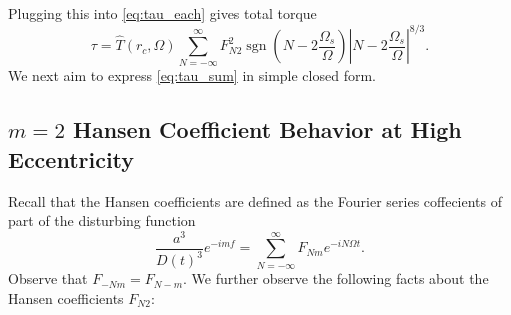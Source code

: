 \documentclass[
        fleqn,
        usenatbib,
        referee,
    ]{mnras}
\newcommand*{\abs}[1]{\left|#1\right|}
\newcommand*{\p}[1]{\left(#1\right)}
\DeclareMathOperator*{\sgn}{sgn}
\begin{document}
Plugging this into \autoref{eq:tau_each} gives total torque
\begin{equation}
    \tau = \hat{T}(r_c, \Omega) \sum\limits_{N = -\infty}^\infty
        F_{N2}^2 \sgn\p{N - 2\frac{\Omega_s}{\Omega}}
            \abs{N - 2\frac{\Omega_s}{\Omega}}^{8/3}.\label{eq:tau_sum}
\end{equation}
We next aim to express \autoref{eq:tau_sum} in simple closed form.

\subsection{$m=2$ Hansen Coefficient Behavior at High Eccentricity}

Recall that the Hansen coefficients are defined as the Fourier series coffecients
of part of the disturbing function
\begin{equation}
    \frac{a^3}{D(t)^3} e^{-imf} = \sum\limits_{N = -\infty}^\infty
        F_{Nm} e^{-iN\Omega t}.\label{eq:hansen_series}
\end{equation}
Observe that $F_{-Nm} = F_{N-m}$. We further observe the following facts about
the Hansen coefficients $F_{N2}$:
\end{document}
